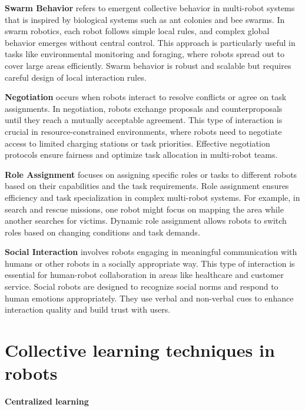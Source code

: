     \textbf{Swarm Behavior} refers to emergent collective behavior in multi-robot systems that is inspired by biological systems such as ant colonies and bee swarms. In swarm robotics, each robot follows simple local rules, and complex global behavior emerges without central control. This approach is particularly useful in tasks like environmental monitoring and foraging, where robots spread out to cover large areas efficiently. Swarm behavior is robust and scalable but requires careful design of local interaction rules. \cite{brambilla-2013-swarm-robotics-review}
    
    \textbf{Negotiation} occurs when robots interact to resolve conflicts or agree on task assignments. In negotiation, robots exchange proposals and counterproposals until they reach a mutually acceptable agreement. This type of interaction is crucial in resource-constrained environments, where robots need to negotiate access to limited charging stations or task priorities. Effective negotiation protocols ensure fairness and optimize task allocation in multi-robot teams. \cite{jennings-2001-automated-negotiation-challenges}
    
    \textbf{Role Assignment} focuses on assigning specific roles or tasks to different robots based on their capabilities and the task requirements. Role assignment ensures efficiency and task specialization in complex multi-robot systems. For example, in search and rescue missions, one robot might focus on mapping the area while another searches for victims. Dynamic role assignment allows robots to switch roles based on changing conditions and task demands. \cite{gerkey-2004-task-allocation-multi-robot-systems}
    
    \textbf{Social Interaction} involves robots engaging in meaningful communication with humans or other robots in a socially appropriate way. This type of interaction is essential for human-robot collaboration in areas like healthcare and customer service. Social robots are designed to recognize social norms and respond to human emotions appropriately. They use verbal and non-verbal cues to enhance interaction quality and build trust with users. \cite{fong-2003-socially-interactive-robots-survey}





\section{Collective learning techniques in robots}
    \textbf{Centralized learning}

